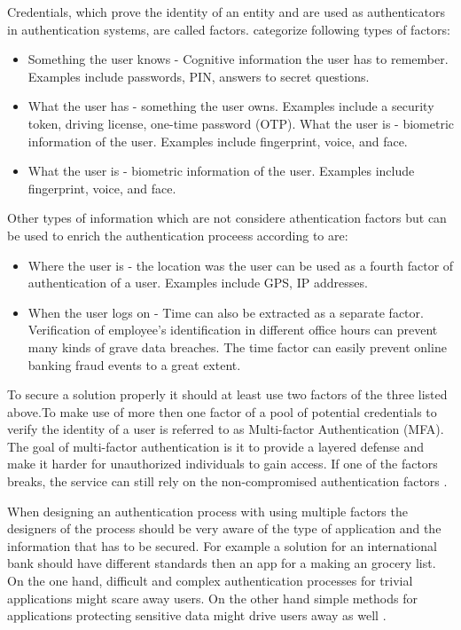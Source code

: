 Credentials, which prove the identity of an entity and are used as authenticators in authentication systems, are called factors. \citet{NIST:2017:DIG} categorize following types of factors:

\begin{itemize}  
\item Something the user knows - Cognitive information the user has to remember. Examples include passwords, PIN, answers to secret questions.
\item What the user has - something the user owns. Examples include a security token, driving license, one-time password (OTP). 
What the user is - biometric information of the user. Examples include fingerprint, voice, and face.  
\item What the user is - biometric information of the user. Examples include fingerprint, voice, and face. 
\end{itemize}

 Other types of information which are not considere athentication factors but  can be used to enrich the authentication proceess according to \citet{Dasgupta:2017:AUA} are:
 
 \begin{itemize}
 	\item Where the user is - the location was the user can be used as a fourth factor of authentication of a user. Examples include GPS, IP addresses.
 	\item When the user logs on - Time can also be extracted as a separate factor. Verification of employee’s identification in different office hours can prevent many kinds of grave data breaches. The time factor can easily prevent online banking fraud events to a great extent. 
 \end{itemize}




To secure a solution properly it should at least use two factors of the three listed above.To make use of more then one factor of a pool of potential credentials to verify the identity of a user is referred to as Multi-factor Authentication (MFA). The goal of multi-factor authentication is it to provide a layered defense and make it harder for unauthorized individuals to gain access. If one of the factors breaks, the service can still rely on the non-compromised authentication factors \citet{Dasgupta:2017:AUA}. 

When designing an authentication process with using multiple factors the designers of the process should be very aware of the type of application and the information that has to be secured. For example a solution for an international bank should have different standards then an app for a making an grocery list. On the one hand, difficult and complex authentication processes for trivial applications might scare away users. On the other hand simple methods for applications protecting sensitive data might drive users away as well \citet{NIST:2017:DIG} . 

